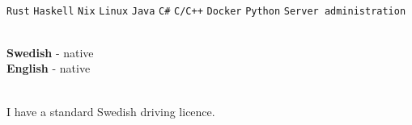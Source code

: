 \documentclass[9pt]{developercv}
\begin{document}
\begin{minipage}[t]{0.3\textwidth}
	\vspace{-\baselineskip}
		\\{
			\texttt{Rust}\slashsep
			\texttt{Haskell}\slashsep
			\texttt{Nix}\slashsep
			\texttt{Linux}\slashsep
			\texttt{Java}\slashsep
			\texttt{C\#}\slashsep
			\texttt{C/C++}\slashsep
			\texttt{Docker}\slashsep
			\texttt{Python}\slashsep
			\texttt{Server administration}
		}
\end{minipage}
\hfill
\begin{minipage}[t]{0.3\textwidth}
	\vspace{-\baselineskip}
	\\
	\textbf{Swedish} - native\\
	\textbf{English} - native
\end{minipage}
\hfill
\begin{minipage}[t]{0.3\textwidth}
	\vspace{-\baselineskip}
	\\I have a standard Swedish driving licence.
\end{minipage}
\end{document}
